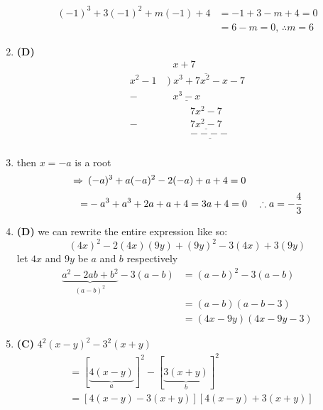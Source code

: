 \begin{multicols}{2}
\begin{enumerate}[label={\textbf{\arabic*.}}]
\begin{align*} 
    (-1)^3 + 3(-1)^2 + m(-1) + 4 & = -1 + 3 -m + 4 = 0 \\
    & = 6- m  = 0, \, \therefore m = 6
\end{align*}
\item \textbf{(D)}
\begin{align*} 
    & \hspace{7pt} x + 7\\
   x^2 - 1\hspace{3pt}  & \overline{) \hspace{3pt} x^3 + 7x^2 - x - 7} \\
   -& \hspace{7pt} \underline{x^3 - x} \\
   & \hspace{28pt} 7x^2 - 7 \\
   -& \hspace{28pt} \underline{7x^2 - 7} \\
   & \hspace{28pt} \underline{----} \\
\end{align*}
\item then $x = -a$ is a root
\begin{align*} 
     \Rightarrow \hspace{5pt} &(-a)^3 + a(-a)^2 - 2(-a) + a + 4  = 0\\
      = &-a^3 + a^3 + 2a + a + 4 = 3a + 4 = 0 \hspace{10pt} \therefore a = -\cfrac{4}{3}
\end{align*}
\item \textbf{(D)} we can rewrite the entire expression like so: \vspace{-5pt}
$$(4x)^2 - 2(4x)(9y) + (9y)^2 - 3(4x) + 3(9y)$$
let $4x$ and $9y$ be $a$ and $b$ respectively \\
\begin{align*}
\underbrace{a^2 -2ab +b^2}_{(a-b)^2} -3(a - b) &= (a-b)^2 -3(a-b) \\
& = (a-b)(a-b -3) \\
& = (4x - 9y)(4x - 9y - 3)
\end{align*}
\item \textbf{(C)}  $4^2 (x-y)^2 - 3^2(x+y)$
\begin{align*} 
     & = [\underbrace{4(x-y)}_{a}]^2 -[\underbrace {3(x+y)}_{b}]^2 \\
    & = \left[4(x-y) -3(x+y)\right]\left[4(x-y) + 3(x+y)\right] \\

\end{align*}
\end{enumerate}
\end{multicols}
